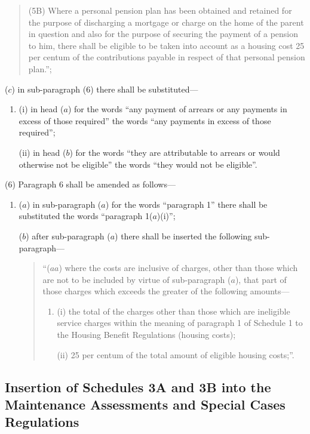 \documentclass[12pt,a4paper]{article}
\begin{document}
\begin{enumerate}
\begin{quotation}
(5B) Where a personal pension plan has been obtained and retained for the purpose of discharging a mortgage or charge on the home of the parent in question and also for the purpose of securing the payment of a pension to him, there shall be eligible to be taken into account as a housing cost 25 per centum of the contributions payable in respect of that personal pension plan.”;
\end{quotation}

($c$) in sub-paragraph (6) there shall be substituted—
\begin{enumerate}\item[]
(i) in head ($a$) for the words “any payment of arrears or any payments in excess of those required” the words “any payments in excess of those required”;

(ii) in head ($b$) for the words “they are attributable to arrears or would otherwise not be eligible” the words “they would not be eligible”.
\end{enumerate}
\end{enumerate}

(6) Paragraph 6 shall be amended as follows—
\begin{enumerate}\item[]
($a$) in sub-paragraph ($a$) for the words “paragraph 1” there shall be substituted the words “paragraph 1($a$)(i)”;

($b$) after sub-paragraph ($a$) there shall be inserted the following sub-paragraph—
\begin{quotation}
“($aa$) where the costs are inclusive of charges, other than those which are not to be included by virtue of sub-paragraph ($a$), that part of those charges which exceeds the greater of the following amounts—
\begin{enumerate}\item[]
(i) the total of the charges other than those which are ineligible service charges within the meaning of paragraph 1 of Schedule 1 to the Housing Benefit Regulations (housing costs);

(ii) 25 per centum of the total amount of eligible housing costs;”.
\end{enumerate}
\end{quotation}
\end{enumerate}

\subsection[57. Insertion of Schedules 3A and 3B into the Maintenance Assessments and Special Cases Regulations]{Insertion of Schedules 3A and 3B into the Maintenance Assessments and Special Cases Regulations}
\end{document}
